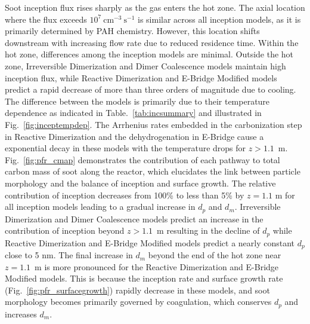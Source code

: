 Soot inception flux rises sharply as the gas enters the hot zone. The axial location where the flux exceeds $10^7~\mathrm{cm^{-3}~s^{-1}}$ is similar across all inception models, as it is primarily determined by PAH chemistry. However, this location shifts downstream with increasing flow rate due to reduced residence time. Within the hot zone, differences among the inception models are minimal. Outside the hot zone, Irreversible Dimerization and Dimer Coalescence models maintain high inception flux, while Reactive Dimerization and E-Bridge Modified models predict a rapid decrease of more than three orders of magnitude due to cooling. The difference between the models is primarily due to their temperature dependence as indicated in Table.~\ref{tab:incsummary} and illustrated in Fig.~\ref{fig:inceptempdep}. The Arrhenius rates embedded in the carbonization step in Reactive Dimerization and the dehydrogenation in E-Bridge cause a exponential decay in these models with the temperature drops for $z>1.1$~m. Fig.~\ref{fig:pfr_cmap} demonstrates the contribution of each pathway to total carbon mass of soot along the reactor, which elucidates the link between particle morphology and the balance of inception and surface growth. The relative contribution of inception decreases from 100\% to less than 5\% by $z=1.1$ m for all inception models leading to a gradual increase in $d_p$ and $d_m$. Irreversible Dimerization and Dimer Coalescence models predict an increase in the contribution of inception beyond $z>1.1$~m resulting in the decline of $d_p$ while Reactive Dimerization and E-Bridge Modified models predict a nearly constant $d_p$ close to 5 nm. The final increase in $d_m$ beyond the end of the hot zone near $z = 1.1$~m is more pronounced for the Reactive Dimerization and E-Bridge Modified models. This is because the inception rate and surface growth rate (Fig.~\ref*{fig:pfr_surfacegrowth}) rapidly decrease in these models, and soot morphology becomes primarily governed by coagulation, which conserves $d_p$ and increases $d_m$.


